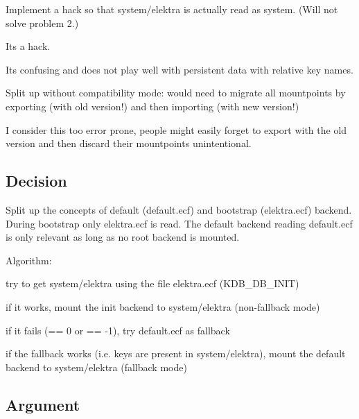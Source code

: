 \begin{DoxyItemize}
\item Implement a hack so that {\ttfamily system/elektra} is actually read as {\ttfamily system}. (Will not solve problem 2.)
\begin{DoxyItemize}
\item Its a hack.
\item Its confusing and does not play well with persistent data with relative key names.
\end{DoxyItemize}
\item Split up without compatibility mode\+: would need to migrate all mountpoints by exporting (with old version!) and then importing (with new version!)
\begin{DoxyItemize}
\item I consider this too error prone, people might easily forget to export with the old version and then discard their mountpoints unintentional.
\end{DoxyItemize}
\end{DoxyItemize}

\subsection*{Decision}

Split up the concepts of default ({\ttfamily default.\+ecf}) and bootstrap ({\ttfamily elektra.\+ecf}) backend. During bootstrap only {\ttfamily elektra.\+ecf} is read. The default backend reading {\ttfamily default.\+ecf} is only relevant as long as no root backend is mounted.

Algorithm\+:


\begin{DoxyEnumerate}
\item try to get system/elektra using the file elektra.\+ecf (K\+D\+B\+\_\+\+D\+B\+\_\+\+I\+N\+IT)
\item if it works, mount the init backend to system/elektra (non-\/fallback mode)
\item if it fails (== 0 or == -\/1), try default.\+ecf as fallback
\item if the fallback works (i.\+e. keys are present in system/elektra), mount the default backend to system/elektra (fallback mode)
\end{DoxyEnumerate}

\subsection*{Argument}


